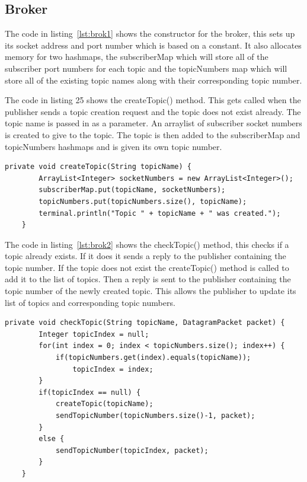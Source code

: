 \documentclass{article}
\begin{document}
\subsection{Broker}

The code in listing~\ref{lst:brok1} shows the constructor for the broker, this sets up its socket address and port number which is based on a constant. It also allocates memory 
for two hashmaps, the subscriberMap which will store all of the subscriber port numbers for each topic and the topicNumbers map which will store all of the existing topic names along with their corresponding topic number.

The code in listing 25 shows the createTopic() method. This gets called when the publisher sends a topic creation request and the topic does not exist already. The topic name is passed in as a parameter. An arraylist of subscriber socket numbers is created to give to the topic. The topic is then added to the subscriberMap and topicNumbers hashmaps and is given its own topic number.

\begin{lstlisting}[caption={[Sample Code 2]onReceipt() method, handles packets received on the publishers port}, label={lst:brok1}]
private void createTopic(String topicName) {
		ArrayList<Integer> socketNumbers = new ArrayList<Integer>();
		subscriberMap.put(topicName, socketNumbers);
		topicNumbers.put(topicNumbers.size(), topicName);
		terminal.println("Topic " + topicName + " was created.");
	}
\end{lstlisting}

The code in listing~\ref{lst:brok2} shows the checkTopic() method, this checks if a topic already exists. If it does it sends a reply to the publisher containing the topic number. If the topic does not exist the createTopic() method is called to add it to the list of topics. Then a reply is sent to the publisher containing the topic number of the newly created topic. This allows the publisher to update its list of topics and corresponding topic numbers.

\begin{lstlisting}[caption={[Sample Code 2]onReceipt() method, handles packets received on the publishers port}, label={lst:brok2}]
private void checkTopic(String topicName, DatagramPacket packet) {
		Integer topicIndex = null;
		for(int index = 0; index < topicNumbers.size(); index++) {
			if(topicNumbers.get(index).equals(topicName));
				topicIndex = index;
		}
		if(topicIndex == null) {
			createTopic(topicName);
			sendTopicNumber(topicNumbers.size()-1, packet);
		}
		else {
			sendTopicNumber(topicIndex, packet);
		}
	}
\end{lstlisting}
\end{document}
